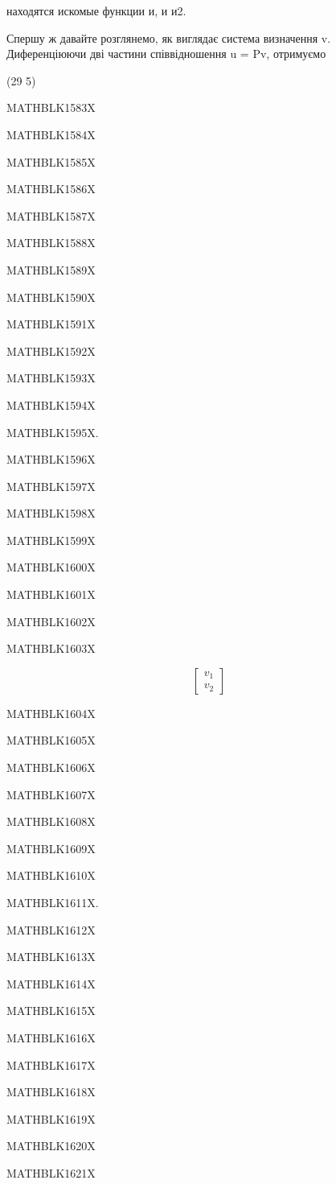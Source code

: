 \documentclass[
  ukrainian,
]{article}
\begin{document}
находятся искомые функции и, и и2.

Спершу ж давайте розглянемо, як виглядає система визначення v.
Диференціюючи дві частини співвідношення u = Pv, отримуємо

(29 5)

MATHBLK1583X

MATHBLK1584X

MATHBLK1585X

MATHBLK1586X

MATHBLK1587X

MATHBLK1588X

MATHBLK1589X

MATHBLK1590X

MATHBLK1591X

MATHBLK1592X

MATHBLK1593X

MATHBLK1594X

MATHBLK1595X.

MATHBLK1596X

MATHBLK1597X

MATHBLK1598X

MATHBLK1599X

MATHBLK1600X

MATHBLK1601X

MATHBLK1602X

MATHBLK1603X

\[
\begin{bmatrix} v_1 \\ v_2 \end{bmatrix}
\]

MATHBLK1604X

MATHBLK1605X

MATHBLK1606X

MATHBLK1607X

MATHBLK1608X

MATHBLK1609X

MATHBLK1610X

MATHBLK1611X.

MATHBLK1612X

MATHBLK1613X

MATHBLK1614X

MATHBLK1615X

MATHBLK1616X

MATHBLK1617X

MATHBLK1618X

MATHBLK1619X

MATHBLK1620X

MATHBLK1621X
\end{document}
